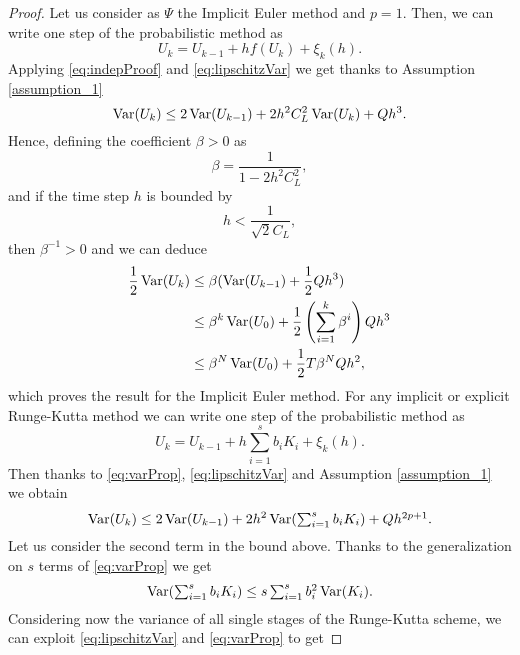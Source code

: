 \begin{proof} Let us consider as $\Psi$ the Implicit Euler method and $p = 1$. Then, we can write one step of the probabilistic method as
\begin{equation}
	U_{k} = U_{k-1} + hf(U_{k}) + \xi_k(h).
\end{equation}
Applying \eqref{eq:indepProof} and \eqref{eq:lipschitzVar} we get thanks to Assumption \ref{assumption_1}
\begin{equation}
	\operatorname{Var}(U_k) \leq 2\operatorname{Var}(U_{k-1}) + 2h^2C_L^2 \operatorname{Var}(U_k) + Q h^3.
\end{equation}
Hence, defining the coefficient $\beta > 0$ as 
\begin{equation}
	\beta = \frac{1}{1 - 2h^2C_L^2}, 
\end{equation}
and if the time step $h$ is bounded by
\begin{equation}
	h < \frac{1}{\sqrt{2}C_L},
\end{equation}
then $\beta^{-1} > 0$ and we can deduce
\begin{equation}
\begin{aligned}
	\frac{1}{2}\operatorname{Var}(U_k) &\leq \beta(\operatorname{Var}(U_{k-1}) + \frac{1}{2}Q h^3) \\
	&\leq \beta^k \operatorname{Var}(U_0) + \frac{1}{2}\left(\sum_{i = 1}^{k} \beta^i\right) Q h^3 \\
	&\leq \beta^N \operatorname{Var}(U_0) + \frac{1}{2}T \beta^N Q h^2,
\end{aligned}
\end{equation}
which proves the result for the Implicit Euler method. For any implicit or explicit Runge-Kutta method we can write one step of the probabilistic method as
\begin{equation}
U_k = U_{k-1} + h\sum_{i=1}^{s}b_iK_i + \xi_k(h).
\end{equation}
Then thanks to \eqref{eq:varProp}, \eqref{eq:lipschitzVar} and Assumption \ref{assumption_1} we obtain
\begin{equation}\label{eq:partialLemRKI}
\operatorname{Var}(U_k) \leq 2 \operatorname{Var}(U_{k-1}) + 2h^2\operatorname{Var}(\textstyle\sum_{i=1}^{s}b_i K_i) + Q h^{2p + 1}.
\end{equation}
Let us consider the second term in the bound above. Thanks to the generalization on $s$ terms of \eqref{eq:varProp} we get
\begin{equation}
\operatorname{Var}(\textstyle \sum_{i=1}^{s}b_i K_i) \leq s \sum_{i=1}^s b_i^2 \operatorname{Var}(K_i).
\end{equation}
Considering now the variance of all single stages of the Runge-Kutta scheme, we can exploit \eqref{eq:lipschitzVar} and \eqref{eq:varProp} to get

\end{proof}
